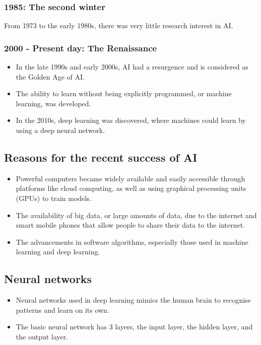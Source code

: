 \documentclass[11pt]{article}
\begin{document}
\subsubsection{1985: The second winter}
\label{sec:org40298e4}
From 1973 to the early 1980s, there was very little research interest in AI.
\subsubsection{2000 - Present day: The Renaissance}
\label{sec:org708d790}
\begin{itemize}
\item In the late 1990s and early 2000s, AI had a resurgence and is considered as the Golden Age of AI.
\item The ability to learn without being explicitly programmed, or machine learning, was developed.
\item In the 2010s, deep learning was discovered, where machines could learn by using a deep neural network.
\end{itemize}
\subsection{Reasons for the recent success of AI}
\label{sec:org136c078}
\begin{itemize}
\item Powerful computers became widely available and easily accessible through platforms like cloud computing, as well as using graphical processing units (GPUs) to train models.
\item The availability of big data, or large amounts of data, due to the internet and smart mobile phones that allow people to share their data to the internet.
\item The advancements in software algorithms, especially those used in machine learning and deep learning.
\end{itemize}
\subsection{Neural networks}
\label{sec:orgf4635b9}
\begin{itemize}
\item Neural networks used in deep learning mimics the human brain to recognise patterns and learn on its own.
\item The basic neural network has 3 layers, the input layer, the hidden layer, and the output layer.
\end{itemize}
\end{document}
